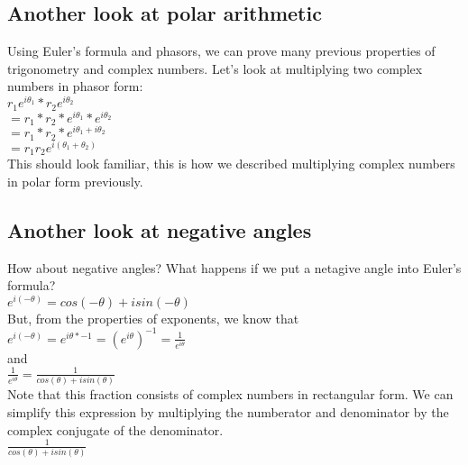 \subsection{Another look at polar arithmetic}

Using Euler's formula and phasors, we can prove many previous properties of trigonometry and complex numbers. Let's look at multiplying two complex numbers in phasor form:\\

\tab$r_1e^{i\theta_1} * r_2e^{i\theta_2}$\\

\tab$= r_1*r_2 * e^{i\theta_1} * e^{i\theta_2}$\\

\tab$= r_1*r_2 * e^{i\theta_1 + i\theta_2}$\\

\tab$= r_1r_2e^{i(\theta_1 + \theta_2)}$\\

This should look familiar, this is how we described multiplying complex numbers in polar form previously.\\


\subsection{Another look at negative angles}

How about negative angles?  What happens if we put a netagive angle into Euler's formula?\\

\tab$e^{i(-\theta)} = cos(-\theta) + isin(-\theta)$\\

But, from the properties of exponents, we know that\\

\tab$e^{i(-\theta)} = e^{i\theta * -1} = (e^{i\theta})^{-1} = \frac{1}{e^{i\theta}}$\\

and\\

\tab$\frac{1}{e^{i\theta}} = \frac{1}{cos(\theta) + isin(\theta)}$\\

Note that this fraction consists of complex numbers in rectangular form.  We can simplify this expression by multiplying the numberator and denominator by the complex conjugate of the denominator.\\

\tab$\frac{1}{cos(\theta) + isin(\theta)}$\\

